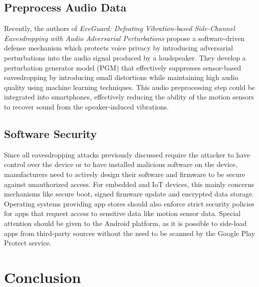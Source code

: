 \documentclass[sigconf, nonacm]{acmart}
\begin{document}
\subsection{Preprocess Audio Data}
Recently, the authors of \textit{EveGuard: Defeating Vibration-based Side-Channel Eavesdropping with Audio Adversarial Perturbations} \cite{EveGuard2024} propose a software-driven defense mechanism which protects voice privacy by introducing adversarial perturbations into the audio signal produced by a loudspeaker.
They develop a perturbation generator model (PGM) that effectively suppresses sensor-based eavesdropping by introducing small distortions while maintaining high audio quality using machine learning techniques.
This audio preprocessing step could be integrated into smartphones, effectively reducing the ability of the motion sensors to recover sound from the speaker-induced vibrations.

\subsection{Software Security}
Since all eavesdropping attacks previously discussed require the attacker to have control over the device or to have installed malicious software on the device, manufacturers need to actively design their software and firmware to be secure against unauthorized access.
For embedded and IoT devices, this mainly concerns mechanisms like secure boot, signed firmware update and encrypted data storage.
Operating systems providing app stores should also enforce strict security policies for apps that request access to sensitive data like motion sensor data.
Special attention should be given to the Android platform, as it is possible to side-load apps from third-party sources without the need to be scanned by the Google Play Protect service.

\section{Conclusion}


\newpage




\end{document}
